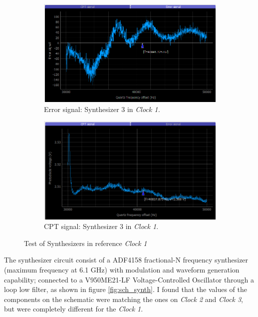 \documentclass[a4paper,12pt]{article}
\begin{document}
\begin{figure}[!h]
\centering
\begin{subfigure}[b]{0.49\textwidth}
\centering
\includegraphics[height=0.5\textwidth]{Images/c1_synth_3_2_2.png}
\captionsetup{justification=centering}
\caption{Error signal: Synthesizer 3 in \textit{Clock 1.}}
\end{subfigure}
\hfill
\begin{subfigure}[b]{0.49\textwidth}
\centering
\includegraphics[height=0.5\textwidth]{Images/c1_synth_3_1_2.png}
\captionsetup{justification=centering}
\caption{CPT signal: Synthesizer 3 in \textit{Clock 1}.}
\end{subfigure}

\caption{Test of Synthesizers in reference \textit{Clock 1}} 
\label{fig:synth_test}
\end{figure}

The synthesizer circuit consist of a ADF4158 fractional-N frequency synthesizer (maximum frequency at 6.1 GHz) with modulation and waveform generation capability; connected to a V950ME21-LF Voltage-Controlled Oscillator through a loop low filter, as shown in figure \ref{fig:sch_synth}. I found that the values of the components on the schematic were matching the ones on \textit{Clock 2} and \textit{Clock 3}, but were completely different for the \textit{Clock 1}. 
\end{document}
